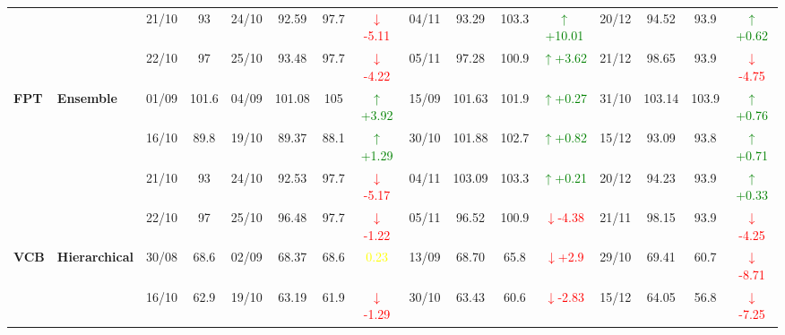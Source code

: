 \documentclass{ieeeaccess}
\begin{document}
{\begin{longtable}{llcc|cccc|cccc|cccc}
&
& 21/10 & 93 & 24/10 & 92.59 & 97.7 & \textcolor{red}{\(\downarrow\)-5.11} & 04/11 & 93.29 & 103.3 & \textcolor{green}{\(\uparrow\)+10.01} & 20/12 & 94.52 & 93.9 & \textcolor{green}{\(\uparrow\)+0.62} \\

&
& 22/10 & 97 & 25/10 & 93.48 & 97.7 & \textcolor{red}{\(\downarrow\)-4.22} & 05/11 & 97.28 & 100.9 & \textcolor{green}{\(\uparrow\)+3.62} & 21/12 & 98.65 & 93.9 & \textcolor{red}{\(\downarrow\)-4.75} \\
\midrule



\multirow{4}{*}{\textbf{FPT}} 
& \textbf{Ensemble}
& 01/09 & 101.6 & 04/09 & 101.08 & 105 & \textcolor{green}{\(\uparrow\)+3.92} & 15/09 & 101.63 & 101.9 & \textcolor{green}{\(\uparrow\)+0.27} & 31/10 & 103.14 & 103.9 & \textcolor{green}{\(\uparrow\)+0.76} \\

&
& 16/10 & 89.8 & 19/10 & 89.37 & 88.1 & \textcolor{green}{\(\uparrow\)+1.29} & 30/10 & 101.88 & 102.7 & \textcolor{green}{\(\uparrow\)+0.82} & 15/12 & 93.09 & 93.8 & \textcolor{green}{\(\uparrow\)+0.71} \\

&
& 21/10 & 93 & 24/10 & 92.53 & 97.7 & \textcolor{red}{\(\downarrow\)-5.17} & 04/11 & 103.09 & 103.3 & \textcolor{green}{\(\uparrow\)+0.21} & 20/12 & 94.23 & 93.9 & \textcolor{green}{\(\uparrow\)+0.33} \\

&
& 22/10 & 97 & 25/10 & 96.48 & 97.7 & \textcolor{red}{\(\downarrow\)-1.22} & 05/11 & 96.52 & 100.9 & \textcolor{red}{\(\downarrow\)-4.38} & 21/11 & 98.15 & 93.9 & \textcolor{red}{\(\downarrow\)-4.25} \\
\midrule




\multirow{4}{*}{\textbf{VCB}} 
& \textbf{Hierarchical}
& 30/08 & 68.6 & 02/09 & 68.37 & 68.6 & \textcolor{yellow}{0.23} & 13/09 & 68.70 & 65.8 & \textcolor{red}{\(\downarrow\)+2.9} & 29/10 & 69.41 & 60.7 & \textcolor{red}{\(\downarrow\)-8.71} \\

&
& 16/10 & 62.9 & 19/10 & 63.19 & 61.9 & \textcolor{red}{\(\downarrow\)-1.29} & 30/10 & 63.43 & 60.6 & \textcolor{red}{\(\downarrow\)-2.83} & 15/12 & 64.05 & 56.8 & \textcolor{red}{\(\downarrow\)-7.25} \\


\end{longtable}}
\end{document}
